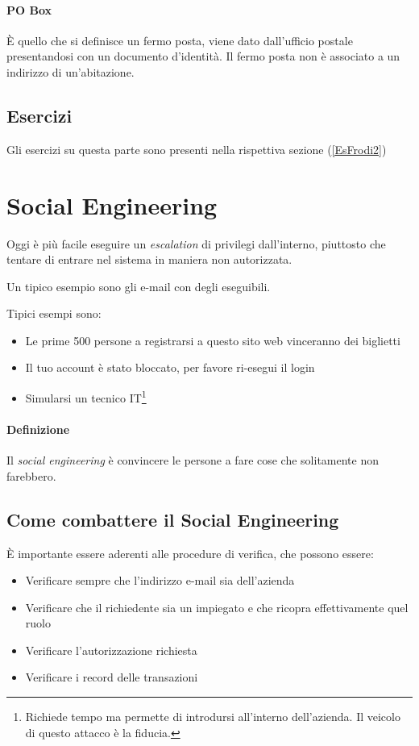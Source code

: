 \paragraph*{PO Box} %

È quello che si definisce un fermo posta, viene dato dall'ufficio postale
presentandosi con un documento d'identità. Il fermo posta non è associato a un
indirizzo di un'abitazione.

\subsection{Esercizi}

Gli esercizi su questa parte sono presenti nella rispettiva sezione
(\ref{EsFrodi2})

\section{Social Engineering}

Oggi è più facile eseguire un \textit{escalation} di privilegi dall'interno,
piuttosto che tentare di entrare nel sistema in maniera non autorizzata.

Un tipico esempio sono gli e-mail con degli eseguibili.

Tipici esempi sono:
\begin{itemize}
  \item Le prime 500 persone a registrarsi a questo sito web vinceranno dei
  biglietti
  \item Il tuo account è stato bloccato, per favore ri-esegui il login
  \item Simularsi un tecnico IT\footnote{Richiede tempo ma permette di
introdursi all'interno dell'azienda. Il veicolo
di questo attacco è la fiducia.}
\end{itemize}

\paragraph*{Definizione} Il \textit{social engineering} è convincere le persone
a fare cose che solitamente non farebbero.

\subsection{Come combattere il Social Engineering}

È importante essere aderenti alle procedure di verifica, che possono essere:
\begin{itemize}
  \item Verificare sempre che l'indirizzo e-mail sia dell'azienda
  \item Verificare che il richiedente sia un impiegato e che ricopra
  effettivamente quel ruolo
  \item Verificare l'autorizzazione richiesta
  \item Verificare i record delle transazioni
\end{itemize}

